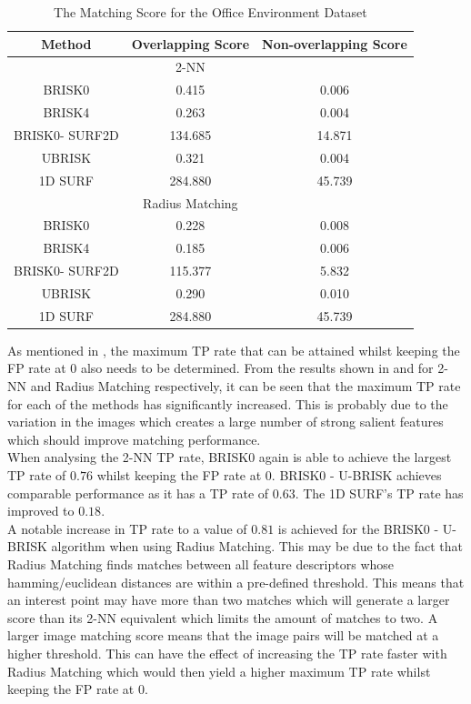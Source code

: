 \documentclass{report}
\begin{document}
\begin{table}
\caption{The Matching Score for the Office Environment Dataset}
\begin{tabular}{|c|c|c|}
\hline 
Method & Overlapping Score & Non-overlapping Score\tabularnewline
\hline 
\hline 
 & 2-NN & \tabularnewline
\hline 
BRISK0 & 0.415 & 0.006\tabularnewline
\hline 
BRISK4 & 0.263 & 0.004\tabularnewline
\hline 
BRISK0- SURF2D & 134.685 & 14.871\tabularnewline
\hline 
UBRISK & 0.321 & 0.004\tabularnewline
\hline 
1D SURF & 284.880 & 45.739\tabularnewline
\hline 
 & Radius Matching & \tabularnewline
\hline 
BRISK0 & 0.228 & 0.008\tabularnewline
\hline 
BRISK4 & 0.185 & 0.006\tabularnewline
\hline 
BRISK0- SURF2D & 115.377 & 5.832\tabularnewline
\hline 
UBRISK & 0.290 & 0.010\tabularnewline
\hline 
1D SURF & 284.880 & 45.739\tabularnewline
\hline 
\end{tabular}
\label{tab:oeMS}
\end{table}



As mentioned in , the maximum TP rate that can be attained whilst keeping the FP rate at $0$ also needs to be determined. From the results shown in  and  for 2-NN and Radius Matching respectively, it can be seen that the maximum TP rate for each of the methods has significantly increased. This is probably due to the variation in the images which creates a large number of strong salient features which should improve matching performance.\\

When analysing the 2-NN TP rate, BRISK0 again is able to achieve the largest TP rate of $0.76$ whilst keeping the FP rate at $0$. BRISK0 - U-BRISK achieves comparable performance as it has a TP rate of $0.63$. The 1D SURF's TP rate has improved to $0.18$.\\

A notable increase in TP rate to a value of $0.81$ is achieved for the BRISK0 - U-BRISK algorithm when using Radius Matching. This may be due to the fact that Radius Matching finds matches between all feature descriptors whose hamming/euclidean distances are within a pre-defined threshold. This means that an interest point may have more than two matches which will generate a larger score than its 2-NN equivalent which limits the amount of matches to two. A larger image matching score means that the image pairs will be matched at a higher threshold. This can have the effect of increasing the TP rate faster with Radius Matching which would then yield a higher maximum TP rate whilst keeping the FP rate at $0$.\\
\end{document}
